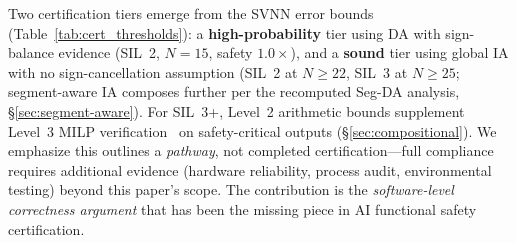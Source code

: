 \documentclass[journal,onecolumn]{IEEEtran}
\begin{document}
Two certification tiers emerge from the SVNN error bounds
(Table~\ref{tab:cert_thresholds}): a \textbf{high-probability} tier using DA
with sign-balance evidence (SIL~2, $N{=}15$, safety $1.0\times$), and a
\textbf{sound} tier using global IA with no sign-cancellation assumption
(SIL~2 at $N{\geq}22$, SIL~3 at $N{\geq}25$; segment-aware IA composes
further per the recomputed Seg-DA analysis, {\S}\ref{sec:segment-aware}).
For SIL~3+, Level~2 arithmetic
bounds supplement Level~3 MILP verification~\cite{schwartz2026optimal} on
safety-critical outputs ({\S}\ref{sec:compositional}). We emphasize this
outlines a \textit{pathway}, not completed certification---full compliance
requires additional evidence (hardware reliability, process audit,
environmental testing) beyond this paper's scope. The contribution is the
\textit{software-level correctness argument} that has been the missing piece
in AI functional safety certification.
\end{document}
